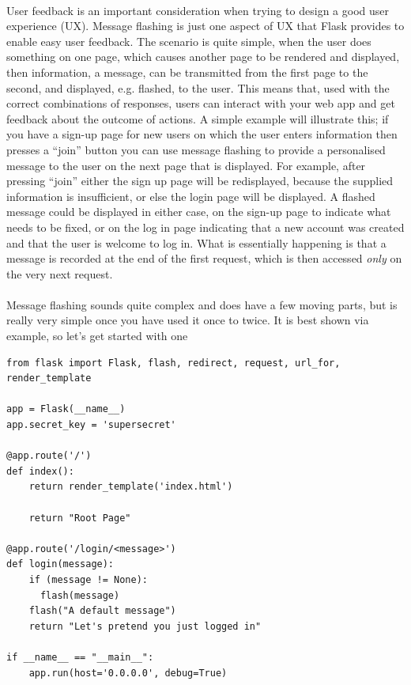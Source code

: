 \documentclass[12pt, a4paper, twoside]{book}
\begin{document}
\paragraph{} User feedback is an important consideration when trying to design a good user experience (UX). Message flashing is just one aspect of UX that Flask provides to enable easy user feedback. The scenario is quite simple, when the user does something on one page, which causes another page to be rendered and displayed, then information, a message, can be transmitted from the first page to the second, and displayed, e.g. flashed, to the user. This means that, used with the correct combinations of responses, users can interact with your web app and get feedback about the outcome of actions. A simple example will illustrate this; if you have a sign-up page for new users on which the user enters information then presses a ``join'' button you can use message flashing to provide a personalised message to the user on the next page that is displayed. For example, after pressing ``join'' either the sign up page will be redisplayed, because the supplied information is insufficient, or else the login page will be displayed. A flashed message could be displayed in either case, on the sign-up page to indicate what needs to be fixed, or on the log in page indicating that a new account was created and that the user is welcome to log in. What is essentially happening is that a message is recorded at the end of the first request, which is then accessed \emph{only} on the very next request.

\paragraph{} Message flashing sounds quite complex and does have a few moving parts, but is really very simple once you have used it once to twice. It is best shown via example, so let's get started with one

\begin{lstlisting}
from flask import Flask, flash, redirect, request, url_for, render_template

app = Flask(__name__)
app.secret_key = 'supersecret'

@app.route('/')
def index():
    return render_template('index.html')

    return "Root Page"

@app.route('/login/<message>')
def login(message):
    if (message != None):
      flash(message)
    flash("A default message")
    return "Let's pretend you just logged in"

if __name__ == "__main__":
    app.run(host='0.0.0.0', debug=True)
\end{lstlisting}
\end{document}
